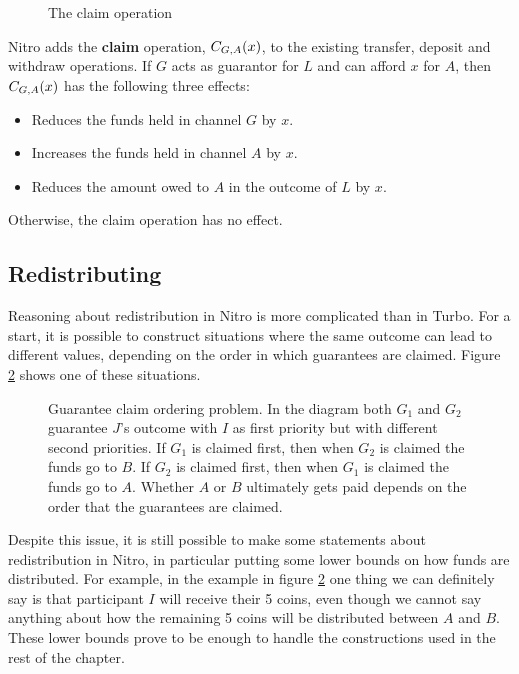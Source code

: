 \begin{figure}[ht]\centering
  \makebox[\textwidth][c]{}
  \caption{The claim operation}
  \label{fig:claim-operation}
\end{figure}

Nitro adds the \textbf{claim} operation, $C_{G, A}(x)$, to the existing transfer, deposit and withdraw operations.
If $G$ acts as guarantor for $L$ and can afford $x$ for $A$, then $C_{G, A}(x)$ has the following three effects:
\begin{itemize}
  \item Reduces the funds held in channel $G$ by $x$.
  \item Increases the funds held in channel $A$ by $x$.
  \item Reduces the amount owed to $A$ in the outcome of $L$ by $x$.
\end{itemize}
Otherwise, the claim operation has no effect.


\subsection{Redistributing}

Reasoning about redistribution in Nitro is more complicated than in Turbo.
For a start, it is possible to construct situations where the same outcome can lead to different values, depending on the order in which guarantees are claimed.
Figure \ref{fig:claim-redistribution-problem} shows one of these situations.
\begin{figure}[ht]\centering
  \makebox[\textwidth][c]{}
  \caption{
    Guarantee claim ordering problem.
    In the diagram both $G_1$ and $G_2$ guarantee $J$'s outcome with $I$ as first priority but with different second priorities.
    If $G_1$ is claimed first, then when $G_2$ is claimed the funds go to $B$.
    If $G_2$ is claimed first, then when $G_1$ is claimed the funds go to $A$.
    Whether $A$ or $B$ ultimately gets paid depends on the order that the guarantees are claimed.
  }
  \label{fig:claim-redistribution-problem}
\end{figure}

Despite this issue, it is still possible to make some statements about redistribution in Nitro, in particular putting some lower bounds on how funds are distributed.
For example, in the example in figure \ref{fig:claim-redistribution-problem} one thing we can definitely say is that participant $I$ will receive their 5 coins, even though we cannot say anything about how the remaining 5 coins will be distributed between $A$ and $B$.
These lower bounds prove to be enough to handle the constructions used in the rest of the chapter.

